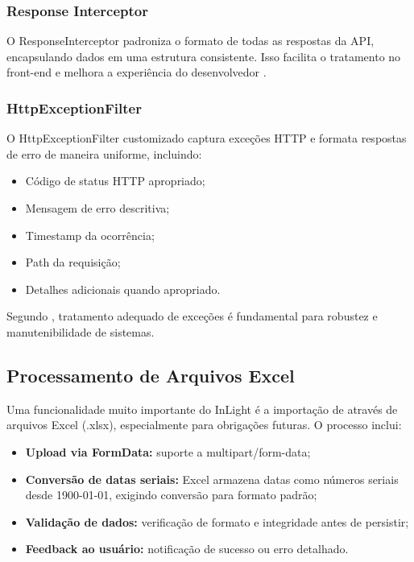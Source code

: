 \subsubsection{Response Interceptor}

O ResponseInterceptor padroniza o formato de todas as respostas da API, encapsulando dados em uma estrutura consistente. Isso facilita o tratamento no front-end e melhora a experiência do desenvolvedor \cite{nestjs2023}.
\subsubsection{HttpExceptionFilter}
O HttpExceptionFilter customizado captura exceções HTTP e formata respostas de erro de maneira uniforme, incluindo:

\begin{itemize}
    \item Código de status HTTP apropriado;
    \item Mensagem de erro descritiva;
    \item Timestamp da ocorrência;
    \item Path da requisição;
    \item Detalhes adicionais quando apropriado.
\end{itemize}

Segundo \cite{pressman2016}, tratamento adequado de exceções é fundamental para robustez e manutenibilidade de sistemas.

\subsection{Processamento de Arquivos Excel}
Uma funcionalidade muito importante do InLight é a importação de através de arquivos Excel (.xlsx), especialmente para obrigações futuras. O processo inclui:

\begin{itemize}
    \item \textbf{Upload via FormData:} suporte a multipart/form-data;
    \item \textbf{Conversão de datas seriais:} Excel armazena datas como números seriais desde 1900-01-01, exigindo conversão para formato padrão;
    \item \textbf{Validação de dados:} verificação de formato e integridade antes de persistir;
    \item \textbf{Feedback ao usuário:} notificação de sucesso ou erro detalhado.
\end{itemize}

